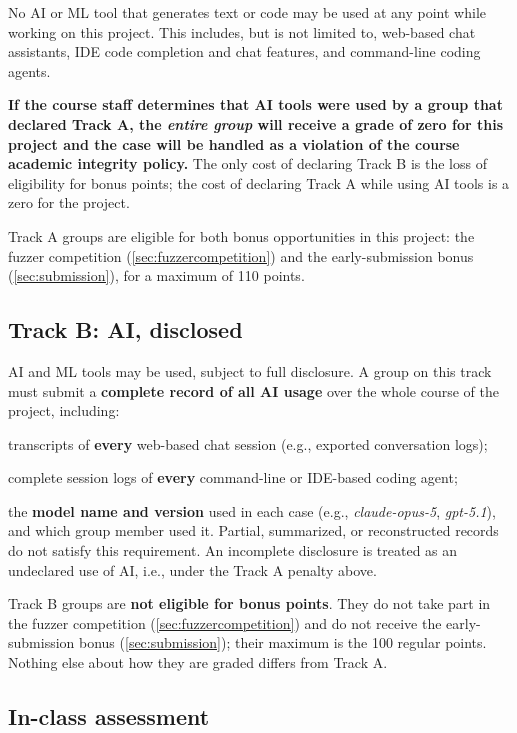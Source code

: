 \documentclass[letterpaper,11pt]{article}
\begin{document}
No AI or ML tool that generates text or code may be used at any point while
working on this project. This includes, but is not limited to, web-based chat
assistants, IDE code completion and chat features, and command-line coding
agents.

\textbf{If the course staff determines that AI tools were used by a group that
declared Track A, the \emph{entire group} will receive a grade of zero for this
project and the case will be handled as a violation of the course academic
integrity policy.} The only cost of declaring Track B is the loss of
eligibility for bonus points; the cost of declaring Track A while using AI
tools is a zero for the project.

Track A groups are eligible for both bonus opportunities in this project: the
fuzzer competition (\autoref{sec:fuzzercompetition}) and the early-submission
bonus (\autoref{sec:submission}), for a maximum of 110 points.

\subsection{Track B: AI, disclosed}

AI and ML tools may be used, subject to full disclosure. A group on this track
must submit a \textbf{complete record of all AI usage} over the whole course of
the project, including:
\squishlist
 \item transcripts of \textbf{every} web-based chat session (e.g., exported
 conversation logs);
 \item complete session logs of \textbf{every} command-line or IDE-based coding
 agent;
 \item the \textbf{model name and version} used in each case (e.g.,
 \textit{claude-opus-5}, \textit{gpt-5.1}), and which group member used it.
\squishend
Partial, summarized, or reconstructed records do not satisfy this requirement.
An incomplete disclosure is treated as an undeclared use of AI, i.e., under the
Track A penalty above.

Track B groups are \textbf{not eligible for bonus points}. They do not take
part in the fuzzer competition (\autoref{sec:fuzzercompetition}) and do not
receive the early-submission bonus (\autoref{sec:submission}); their maximum is
the 100 regular points. Nothing else about how they are graded differs from
Track A.

\subsection{In-class assessment}
\label{sec:aiassessment}
\end{document}
